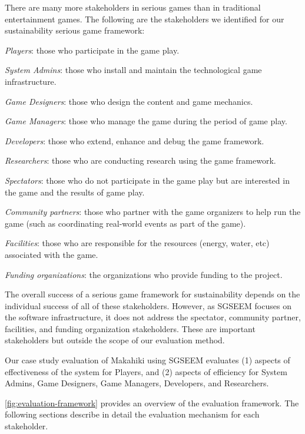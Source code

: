 \documentclass{sigchi}
\begin{document}
There are many more stakeholders in serious games than in traditional entertainment
games. The following are the stakeholders we identified for our sustainability serious game framework:

\begin{compactitem}
\item \emph{Players}: those who participate in the game play.
\item \emph{System Admins}: those who install and maintain the technological game infrastructure.
\item \emph{Game Designers}: those who design the content and game mechanics.
 \item \emph{Game Managers}: those who manage the game during the period of game play.
\item \emph{Developers}: those who extend, enhance and debug the game framework.
\item \emph{Researchers}: those who are conducting research using the game framework.
\item \emph{Spectators}: those who do not participate in the game
  play but are interested in the game and the results of game play.
\item \emph{Community partners}: those who partner
  with the game organizers to help run the game (such as coordinating real-world events as part of the game).
\item \emph{Facilities}: those who are responsible for the resources (energy, water, etc)
  associated with the game.
\item \emph{Funding organizations}: the organizations who provide
  funding to the project.
\end{compactitem}

The overall success of a serious game framework for sustainability depends on the
individual success of all of these stakeholders. However, as SGSEEM focuses on the software
infrastructure, it does not address the spectator, community partner, facilities, and funding
organization stakeholders. These are important stakeholders but outside the scope of our
evaluation method.

Our case study evaluation of Makahiki using SGSEEM evaluates (1) aspects of 
effectiveness of the system for Players, and (2) aspects of
efficiency for System Admins, Game Designers, Game Managers, Developers, and Researchers.

\autoref{fig:evaluation-framework} provides an overview of the evaluation framework. The
following sections describe in detail the evaluation mechanism for each stakeholder.
\end{document}
